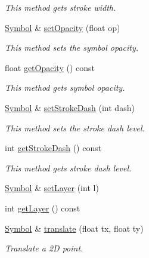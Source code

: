 \begin{DoxyCompactItemize}
\begin{DoxyCompactList}\small\item\em This method gets stroke width. \end{DoxyCompactList}\item 
\hyperlink{classbridges_1_1datastructure_1_1_symbol}{Symbol} \& \hyperlink{classbridges_1_1datastructure_1_1_symbol_a5cecb1e3a9e3b95307f94f6d2a4383a2}{set\+Opacity} (float op)
\begin{DoxyCompactList}\small\item\em This method sets the symbol opacity. \end{DoxyCompactList}\item 
float \hyperlink{classbridges_1_1datastructure_1_1_symbol_a2630c19b6efdda481556195fa149c334}{get\+Opacity} () const
\begin{DoxyCompactList}\small\item\em This method gets symbol opacity. \end{DoxyCompactList}\item 
\hyperlink{classbridges_1_1datastructure_1_1_symbol}{Symbol} \& \hyperlink{classbridges_1_1datastructure_1_1_symbol_ac6cbd0714fef49709b85ef28de8d993c}{set\+Stroke\+Dash} (int dash)
\begin{DoxyCompactList}\small\item\em This method sets the stroke dash level. \end{DoxyCompactList}\item 
int \hyperlink{classbridges_1_1datastructure_1_1_symbol_a1a47a1a3b4bedf3486e4f48b5979da1a}{get\+Stroke\+Dash} () const
\begin{DoxyCompactList}\small\item\em This method gets stroke dash level. \end{DoxyCompactList}\item 
\hyperlink{classbridges_1_1datastructure_1_1_symbol}{Symbol} \& \hyperlink{classbridges_1_1datastructure_1_1_symbol_a0b0489bf812271875be5f0f10be568a1}{set\+Layer} (int l)
\item 
int \hyperlink{classbridges_1_1datastructure_1_1_symbol_a422ce7cdf2cbafd28e399ea9d7e16f2a}{get\+Layer} () const
\item 
\hyperlink{classbridges_1_1datastructure_1_1_symbol}{Symbol} \& \hyperlink{classbridges_1_1datastructure_1_1_symbol_a2b62e07a6d9c1015e212f4dc0cea1858}{translate} (float tx, float ty)
\begin{DoxyCompactList}\small\item\em Translate a 2D point. \end{DoxyCompactList}\item 

\end{DoxyCompactItemize}
